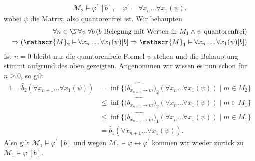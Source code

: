 \begin{solution}
\begin{enumerate}
		\begin{align*}
		\mathscr{M}_2 \vDash \varphi^\prime \ [b], \quad \varphi^\prime = \forall x_n \dots \forall x_1(\psi).
		\end{align*}
		wobei $\psi$ die Matrix, also quantorenfrei ist. Wir behaupten
		\begin{align*}
		\forall n \in \N\, \forall \psi\, \forall b\, (b \text{ Belegung mit Werten in } M_1 \land \psi \text{ quantorenfrei}) \\
		\Rightarrow (\mathscr{M}_2 \vDash \forall x_n \dots \forall x_1 (\psi)[b] \Rightarrow \mathscr{M}_1 \vDash \forall x_n \dots \forall x_1 (\psi)[b])
		\end{align*}
		Ist $n = 0$ bleibt nur die quantorenfreie Formel $\psi$ stehen und die Behauptung stimmt aufgrund des oben gezeigten. Angenommen wir wissen es nun schon für $n \geq 0$, so gilt
		\begin{align*}
		1 = \widehat{b}_2(\forall x_{n + 1} \dots \forall x_1 (\psi)) &= \inf\{\widehat{(b_{x_{n + 1} \to m}})_2(\forall x_n \dots \forall x_1(\psi)) \mid m \in M_2\} \\
		&\leq \inf\{\widehat{(b_{x_{n + 1} \to m}})_2(\forall x_n \dots \forall x_1(\psi)) \mid m \in M_1\} \\
		&\leq \inf\{\widehat{(b_{x_{n + 1} \to m}})_1(\forall x_n \dots \forall x_1(\psi)) \mid m \in M_1\} \\
		&= \widehat{b}_1(\forall x_{n + 1} \dots \forall x_1 (\psi)).
		\end{align*}
		Also gilt $\mathscr{M}_1 \vDash \varphi^\prime \ [b]$ und wegen
    $\mathscr{M}_1 \vDash \varphi \leftrightarrow \varphi^{\prime}$
    kommen wir wieder zurück zu $\mathscr{M}_1 \vDash \varphi \ [b]$.


\end{enumerate}
\end{solution}
